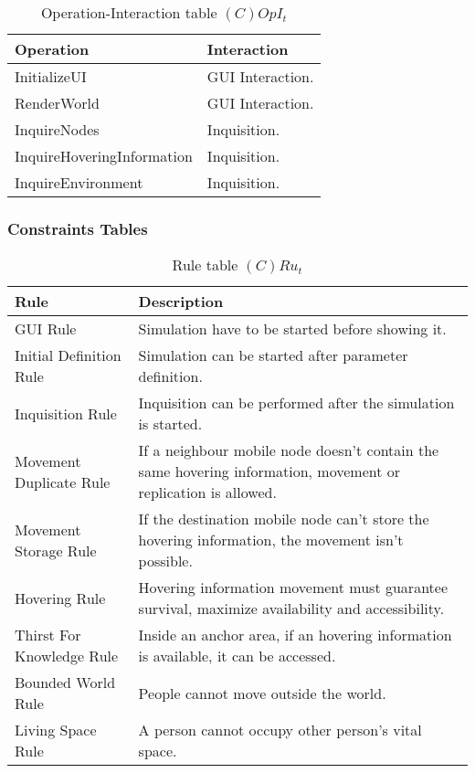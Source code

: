 \begin{table}[H]
	\centering
	\begin{tabular}{|p{5cm}|p{7cm}|}
			\hline
			\textbf{Operation} & \textbf{Interaction} \\
			\hline
			InitializeUI & GUI Interaction. \\
			\hline
			RenderWorld & GUI Interaction. \\
			\hline
			InquireNodes & Inquisition. \\
			\hline
			InquireHoveringInformation & Inquisition. \\
			\hline
			InquireEnvironment & Inquisition. \\
			\hline
		\end{tabular}
	\caption{Operation-Interaction table $(C)OpI_t$}
	\label{tab:opit}
\end{table}

\subsubsection{Constraints Tables}

\begin{table}[H]
	\centering
	\begin{tabular}{|p{4cm}|p{8cm}|}
			\hline
			\textbf{Rule} & \textbf{Description} \\
			\hline
			GUI Rule & Simulation have to be started before showing it.\\
			\hline
			Initial Definition Rule & Simulation can be started after parameter definition.\\
			\hline
			Inquisition Rule & Inquisition can be performed after the simulation is
			started.\\
			\hline
			Movement Duplicate Rule & If a neighbour mobile node doesn't contain the same
			hovering information, movement or replication is allowed. \\
			\hline
			Movement Storage Rule & If the destination mobile node can't store the hovering
			information, the movement isn't possible. \\
			\hline
			Hovering Rule & Hovering information movement must guarantee survival,
			maximize availability and accessibility. \\
			\hline
			Thirst For Knowledge Rule & Inside an anchor area, if an hovering
			information is available, it can be accessed.\\
			\hline
			Bounded World Rule & People cannot move outside the world. \\
			\hline
			Living Space Rule & A person cannot occupy other person's vital space. \\
			\hline
		\end{tabular}
	\caption{Rule table $(C)Ru_t$}
	\label{tab:crut}
\end{table}

